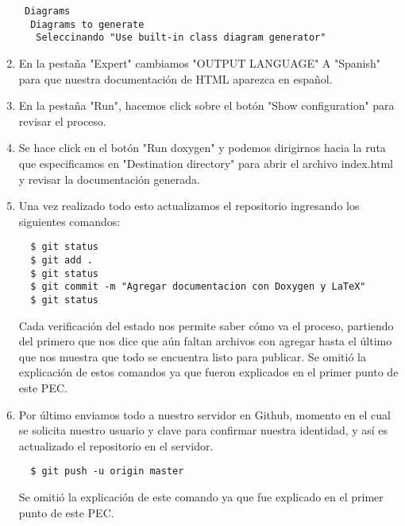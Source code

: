 \documentclass{article}
\begin{document}
\begin{enumerate}
\begin{lstlisting}
 Diagrams
  Diagrams to generate
   Seleccinando "Use built-in class diagram generator"
  \end{lstlisting}

  \item En la pestaña "Expert" cambiamos "OUTPUT LANGUAGE" A "Spanish" para que nuestra documentación de HTML aparezca en español.

  \item En la pestaña "Run", hacemos click sobre el botón "Show configuration" para revisar el proceso.

  \item Se hace click en el botón "Run doxygen" y podemos dirigirnos hacia la ruta que especificamos en "Destination directory" para abrir el archivo index.html y revisar la documentación generada.

  \item Una vez realizado todo esto actualizamos el repositorio ingresando los siguientes comandos:
  \begin{lstlisting}
  $ git status
  $ git add .
  $ git status
  $ git commit -m "Agregar documentacion con Doxygen y LaTeX"
  $ git status
  \end{lstlisting}
  Cada verificación del estado nos permite saber cómo va el proceso, partiendo del primero que nos dice que aún faltan archivos con agregar hasta el último que nos muestra que todo se encuentra listo para publicar.
  Se omitió la explicación de estos comandos ya que fueron explicados en el primer punto de este PEC.

  \item Por último enviamos todo a nuestro servidor en Github, momento en el cual se solicita nuestro usuario y clave para confirmar nuestra identidad, y así es actualizado el repositorio en el servidor.
  \begin{lstlisting}
  $ git push -u origin master
  \end{lstlisting}
  Se omitió la explicación de este comando ya que fue explicado en el primer punto de este PEC.

  \end{enumerate}
  \newpage
\end{document}
